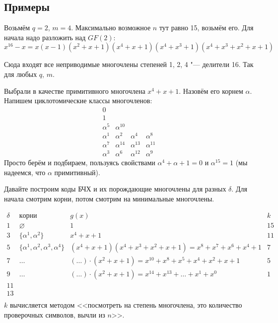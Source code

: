 \subsection{Примеры}
Возьмём $q=2$, $m=4$.
Максимально возможное $n$ тут равно 15, возьмём его.
Для начала надо разложить над $GF(2)$:
\[
x^{16}-x=x(x-1)(x^2+x+1)(x^4+x+1)(x^4+x^3+1)(x^4+x^3+x^2+x+1)
\]
\begin{Rem}
Сюда входят все неприводимые многочлены степеней 1, 2, 4 "--- делители 16.
Так для любых $q$, $m$.
\end{Rem}
Выбрали в качестве примитивного многочлена $x^4+x+1$.
Назовём его корнем $\alpha$.
Напишем циклотомические классы многочленов:
\[
\begin{matrix}
 0 			\\ 	1	\\		     \alpha^5   & \alpha^{10} \\ 
 \alpha^1 		& \alpha^2   & \alpha^4   & \alpha^8 \\ 
 \alpha^7  & \alpha^{14} & \alpha^{13} & \alpha^{11} \\ 
 \alpha^3  & \alpha^6   & \alpha^{12} & \alpha^9
\end{matrix}
\]
Просто берём и подбираем, пользуясь
свойствами $\alpha^4+\alpha+1=0$ и $\alpha^{15}=1$ (мы надеемся, что $\alpha$ примитивный).

Давайте построим коды БЧХ и их порождающие многочлены для разных $\delta$.
Для начала смотрим корни, потом смотрим на минимальные многочлены.

\[
\begin{matrix}
\delta & корни & g(x) & k \\
1&\varnothing&1&15\\
3&\{\alpha^1,\alpha^2\}&x^4+x+1&11\\
5&\{\alpha^1,\alpha^2,\alpha^3,\alpha^4\}&(x^4+x+1)(x^4+x^3+x^2+x+1)=x^8+x^7+x^6+x^4+1&7\\
7&\dots&(\dots)\cdot(x^2+x+1)=x^{10}+x^8+x^5+x^4+x^2+x+1&5\\
9&\dots&(\dots)\cdot(x^2+x+1)=x^{14}+x^{13}+\dots+x^1+x^0 &1\\
11&\\
13&\\
\end{matrix}
\]
$k$ вычисляется методом <<посмотреть на степень многочлена, это количество
проверочных символов, вычли из $n$>>.

